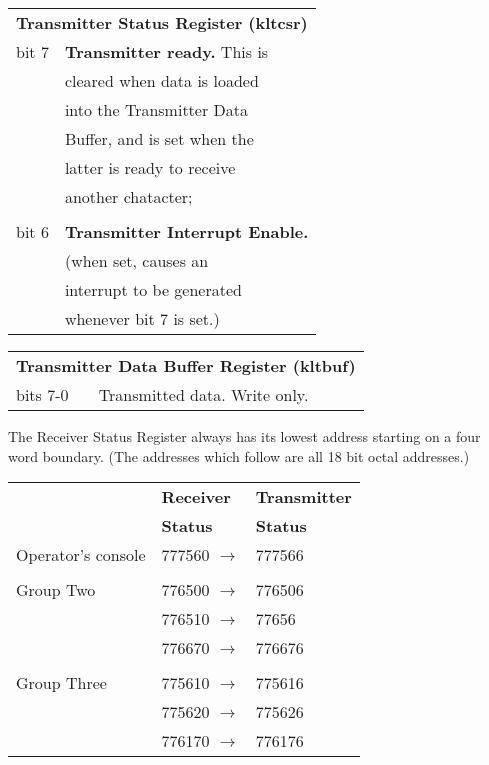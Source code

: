 \noindent\begin{tabular}{ll}\\
\multicolumn{2}{l}{\bf Transmitter Status Register (kltcsr)} \\
bit 7 & {\bf Transmitter ready.} This is\\
      & cleared when data is loaded\\
      & into the Transmitter Data\\
      & Buffer, and is set when the\\
      & latter is ready to receive\\
      & another chatacter;\\
\\
bit 6 & {\bf Transmitter Interrupt Enable.}\\
     & (when set, causes an\\
     & interrupt to be generated\\
     & whenever bit 7 is set.)\\
\end{tabular}

\noindent\begin{tabular}{ll}\\
\multicolumn{2}{l}{\bf Transmitter Data Buffer Register (kltbuf)} \\
bits 7-0 & Transmitted data. Write only.\\
\end{tabular}


The Receiver Status Register always has
its lowest address starting on a four
word boundary. (The addresses which
follow are all 18 bit octal addresses.)

\noindent\begin{tabular}{lll}\\
 & {\bf Receiver} & {\bf Transmitter}\\
 & {\bf Status} & {\bf Status}\\
Operator's console & 777560 $\rightarrow$ & 777566\\
\\
Group Two & 776500 $\rightarrow$ & 776506\\
	& 776510 $\rightarrow$ & 77656 \\ \cline{2-3}
	& 776670 $\rightarrow$ & 776676\\
\\
Group Three & 775610 $\rightarrow$ & 775616\\
        & 775620 $\rightarrow$ & 775626 \\ \cline{2-3}
        & 776170 $\rightarrow$ & 776176\\
\end{tabular}


